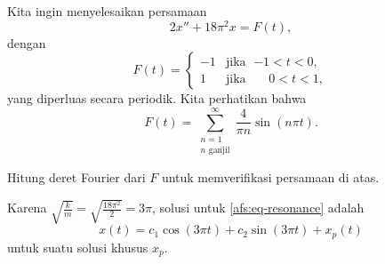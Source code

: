 \begin{example}
Kita ingin menyelesaikan persamaan
\begin{equation} \label{afs:eq-resonance}
2 x'' + 18 \pi^2 x = F(t) ,
\end{equation}
dengan
\begin{equation*}
F(t) =
\begin{cases}
-1 & \text{jika } \; {-1} < t < 0 , \\
1 & \text{jika } \; \phantom{-}0 < t < 1 ,
\end{cases}
\end{equation*}
yang diperluas secara periodik.  Kita perhatikan bahwa
\begin{equation*}
F(t) =
\sum_{\substack{n=1 \\ n \text{ ganjil}}}^\infty
\frac{4}{\pi n}
\sin (n \pi t) . 
\end{equation*}

\begin{exercise}
Hitung deret Fourier dari $F$ untuk memverifikasi persamaan di atas.
\end{exercise}

Karena $\sqrt{\frac{k}{m}} = \sqrt{\frac{18\pi^2}{2}} = 3\pi$,
solusi untuk \eqref{afs:eq-resonance} adalah
\begin{equation*}
x(t) = c_1 \cos  (3\pi t) + c_2 \sin (3\pi t) + x_p (t)
\end{equation*}
untuk suatu solusi khusus $x_p$.


\end{example}
